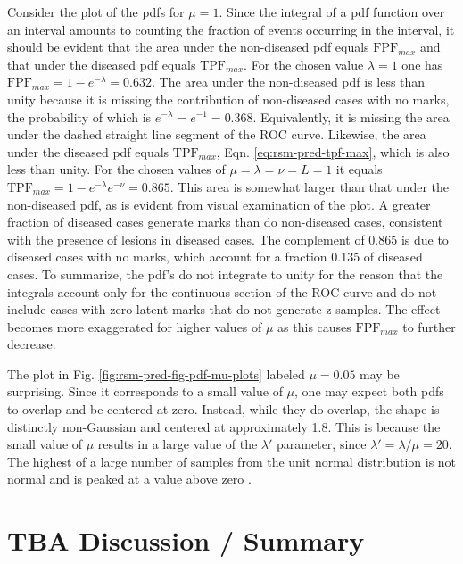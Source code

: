\documentclass[
]{book}
\begin{document}
Consider the plot of the pdfs for \(\mu = 1\). Since the integral of a pdf function over an interval amounts to counting the fraction of events occurring in the interval, it should be evident that the area under the non-diseased pdf equals \(\text{FPF}_{max}\) and that under the diseased pdf equals \(\text{TPF}_{max}\). For the chosen value \(\lambda = 1\) one has \(\text{FPF}_{max} = 1 - e^{-\lambda} = 0.632\). The area under the non-diseased pdf is less than unity because it is missing the contribution of non-diseased cases with no marks, the probability of which is \(e^{-\lambda} = e^{-1} = 0.368\). Equivalently, it is missing the area under the dashed straight line segment of the ROC curve. Likewise, the area under the diseased pdf equals \(\text{TPF}_{max}\), Eqn. \eqref{eq:rsm-pred-tpf-max}, which is also less than unity. For the chosen values of \(\mu = \lambda = \nu = L = 1\) it equals \(\text{TPF}_{max} = 1 - e^{-\lambda} e^{-\nu} = 0.865\). This area is somewhat larger than that under the non-diseased pdf, as is evident from visual examination of the plot. A greater fraction of diseased cases generate marks than do non-diseased cases, consistent with the presence of lesions in diseased cases. The complement of 0.865 is due to diseased cases with no marks, which account for a fraction 0.135 of diseased cases. To summarize, the pdf's do not integrate to unity for the reason that the integrals account only for the continuous section of the ROC curve and do not include cases with zero latent marks that do not generate z-samples. The effect becomes more exaggerated for higher values of \(\mu\) as this causes \(\text{FPF}_{max}\) to further decrease.

The plot in Fig. \ref{fig:rsm-pred-fig-pdf-mu-plots} labeled \(\mu = 0.05\) may be surprising. Since it corresponds to a small value of \(\mu\), one may expect both pdfs to overlap and be centered at zero. Instead, while they do overlap, the shape is distinctly non-Gaussian and centered at approximately 1.8. This is because the small value of \(\mu\) results in a large value of the \(\lambda'\) parameter, since \(\lambda' = \lambda / \mu = 20\). The highest of a large number of samples from the unit normal distribution is not normal and is peaked at a value above zero \citep{fisher1928limiting}.

\hypertarget{rsm-pred-discussion-summary}{%
\section{TBA Discussion / Summary}\label{rsm-pred-discussion-summary}}
\end{document}
